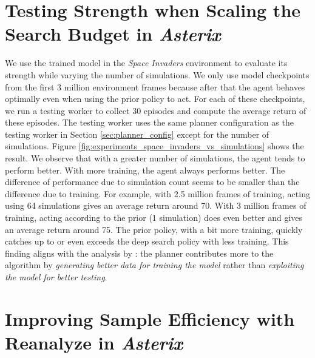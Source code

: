 \FloatBarrier

\section{Testing Strength when Scaling the Search Budget in \textit{Asterix}}
We use the trained \moozi model in the \textit{Space Invaders} environment to evaluate its strength while varying the number of simulations.
We only use model checkpoints from the first 3 million environment frames because after that the agent behaves optimally even when using the prior policy to act.
For each of these checkpoints, we run a testing worker to collect 30 episodes and compute the average return of these episodes.
The testing worker uses the same planner configuration as the testing worker in Section \ref{sec:planner_config} except for the number of simulations.
Figure \ref{fig:experiments_space_invaders_vs_simulations} shows the result.
We observe that with a greater number of simulations, the agent tends to perform better.
With more training, the agent always performs better.
The difference of performance due to simulation count seems to be smaller than the difference due to training.
For example, with 2.5 million frames of training, acting using 64 simulations gives an average return around 70.
With 3 million frames of training, acting according to the prior (1 simulation) does even better and gives an average return around 75.
The prior policy, with a bit more training, quickly catches up to or even exceeds the deep search policy with less training.
This finding aligns with the analysis by \citeauthor{RolePlanningModelbased_Hamrick.Friesen.ea_2022} \cite{RolePlanningModelbased_Hamrick.Friesen.ea_2022}:
the planner contributes more to the algorithm by \textit{generating better data for training the model} rather than \textit{exploiting the model for better testing}.


\FloatBarrier


\section{Improving Sample Efficiency with Reanalyze in \textit{Asterix}} \label{sec:exp:re}

